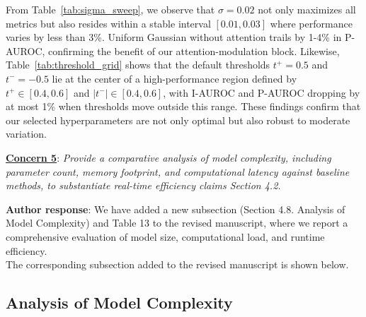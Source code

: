 \documentclass[a4paper,fleqnn]{cas-sc}
\begin{document}
From Table~\ref{tab:sigma_sweep}, we observe that $\sigma = 0.02$ not only maximizes all metrics but also resides within a stable interval $[0.01,0.03]$ where performance varies by less than 3\%. Uniform Gaussian without attention trails by 1-4\% in P-AUROC, confirming the benefit of our attention-modulation block. Likewise, Table~\ref{tab:threshold_grid} shows that the default thresholds $t^+ = 0.5$ and $t^- = -0.5$ lie at the center of a high-performance region defined by $t^+ \in [0.4,0.6]$ and $|t^-| \in [0.4,0.6]$, with I-AUROC and P-AUROC dropping by at most 1\% when thresholds move outside this range. These findings confirm that our selected hyperparameters are not only optimal but also robust to moderate variation.

\vspace{1em}

\noindent \textbf{\underline{Concern 5}}: \textit{Provide a comparative analysis of model complexity, including parameter count, memory footprint, and computational latency against baseline methods, to substantiate real-time efficiency claims Section 4.2. \\}

\noindent \textbf{Author response}: We have added a new subsection (Section 4.8. Analysis of Model Complexity) and Table 13 to the revised manuscript, where we report a comprehensive evaluation of model size, computational load, and runtime efficiency. \\

The corresponding subsection added to the revised manuscript is shown below.

\setcounter{section}{4}
\setcounter{subsection}{7}

\subsection{Analysis of Model Complexity}

\renewcommand{\thetable}{13}
\end{document}
